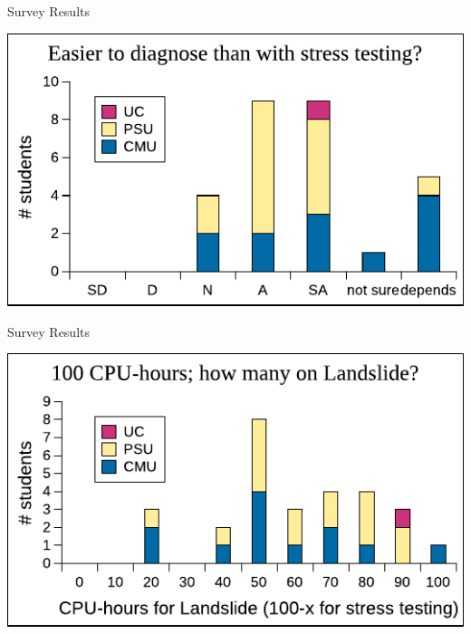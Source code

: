 \documentclass[xcolor=dvipsnames]{beamer}
\begin{document}
\begin{frame}{Survey Results} %
	\begin{center}
		\includegraphics[width=\textwidth]{../survey6.pdf} %
	\end{center}
\end{frame}


\begin{frame}{Survey Results} %
	\begin{center}
		\includegraphics[width=\textwidth]{../survey9.pdf} %
	\end{center}
\end{frame}
\end{document}
